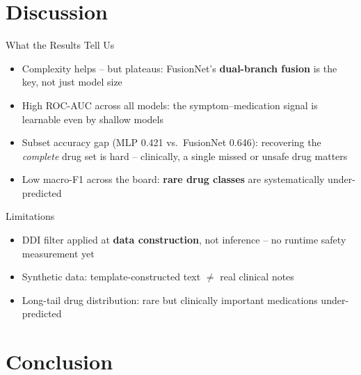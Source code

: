 \section{Discussion}

\begin{frame}{What the Results Tell Us}
    \begin{itemize}
        \item Complexity helps -- but plateaus: FusionNet's \textbf{dual-branch fusion} is the key, not just model size
            \pause
        \item High ROC-AUC across all models: the symptom--medication signal is learnable even by shallow models
            \pause
        \item Subset accuracy gap (MLP 0.421 vs.\ FusionNet 0.646): recovering the \emph{complete} drug set is hard -- clinically, a single missed or unsafe drug matters
            \pause
        \item Low macro-F1 across the board: \textbf{rare drug classes} are systematically under-predicted
    \end{itemize}
\end{frame}

\begin{frame}{Limitations}
    \begin{itemize}
        \item DDI filter applied at \textbf{data construction}, not inference -- no runtime safety measurement yet
            \pause
        \item Synthetic data: template-constructed text $\neq$ real clinical notes
            \pause
        \item Long-tail drug distribution: rare but clinically important medications under-predicted
    \end{itemize}
\end{frame}

\section{Conclusion}

